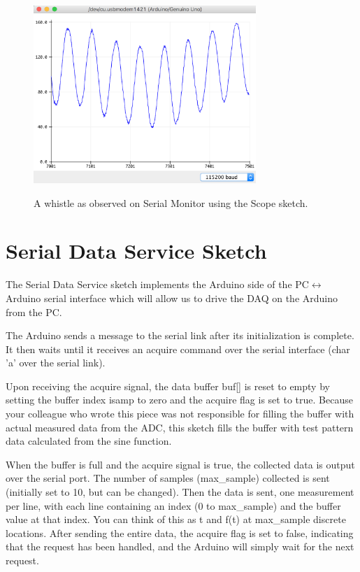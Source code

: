 \documentclass[12pt]{article}
\begin{document}
\begin{figure}[htbp]
\begin{center}
{\includegraphics[width=0.75\textwidth]{figs/whistle.png}}
\end{center}
\caption{\label{fig:whistle} A whistle as observed on Serial Monitor using the Scope sketch.}
\end{figure}

\section{Serial Data Service Sketch}


The Serial Data Service sketch implements the Arduino side of the PC$\leftrightarrow$Arduino serial interface which will allow us to drive the DAQ on the Arduino from the PC.  

The Arduino sends a message to the serial link after its initialization is complete.  It then waits until it receives an acquire command over the serial interface (char 'a' over the serial link).  

 Upon receiving the acquire signal, the data buffer buf[] is reset to empty by setting the buffer index isamp to zero and the acquire flag is set to true.  Because your colleague who wrote this piece was not responsible for filling the buffer with actual measured data from the ADC, this sketch fills the buffer with test pattern data calculated from the sine function.  

 When the buffer is full and the acquire signal is true, the collected data is output over the serial port.
 The number of samples (max\_sample) collected is sent (initially set to 10, but can be changed).  Then the 
  data is sent, one measurement per line, with each line containing an index (0 to max\_sample) and the buffer value
  at that index.  You can think of this as t and f(t) at max\_sample discrete locations.
  After sending the entire data, the acquire flag is set to false, indicating that the request has been handled, and the Arduino will simply wait for the next request.
\end{document}
